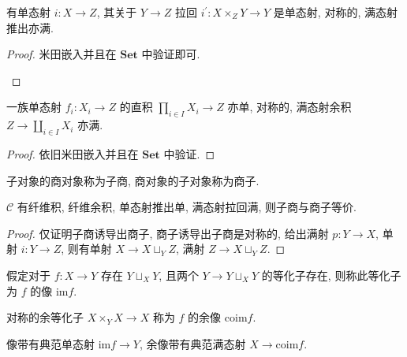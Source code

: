 \begin{lemma}
    有单态射 \(i : X \to Z\), 其关于 \(Y \to Z\) 拉回 \(i^\prime : X \times_Z Y \to Y\) 是单态射,
    对称的, 满态射推出亦满.

    \begin{proof}
        米田嵌入并且在 \(\mathbf{Set}\) 中验证即可.

        \begin{center}
        \end{center}
    \end{proof}
\end{lemma}

\begin{lemma}
    一族单态射 \(f_i : X_i \to Z\) 的直积 \(\prod_{i \in I} X_i \to Z\) 亦单, 对称的, 满态射余积 \(Z \to \coprod_{i \in I} X_i\) 亦满.

    \begin{proof}
        依旧米田嵌入并且在 \(\mathbf{Set}\) 中验证.
    \end{proof}
\end{lemma}

\begin{definition}
    子对象的商对象称为子商, 商对象的子对象称为商子.
\end{definition}

\begin{lemma}
    \(\mathcal{C}\) 有纤维积, 纤维余积, 单态射推出单, 满态射拉回满, 则子商与商子等价.

    \begin{proof}
        仅证明子商诱导出商子, 商子诱导出子商是对称的, 给出满射 \(p : Y \to X\), 单射 \(i : Y \to Z\),
        则有单射 \(X \to X \sqcup_Y Z\), 满射 \(Z \to X \sqcup_Y Z\).
    \end{proof}
\end{lemma}

\begin{definition}
    假定对于 \(f : X \to Y\) 存在 \(Y \sqcup_X Y\), 且两个 \(Y \to Y \sqcup_X Y\) 的等化子存在, 则称此等化子为 \(f\) 的像 \(\mathrm{im} f\).

    对称的余等化子 \(X \times_Y X \to X\) 称为 \(f\) 的余像 \(\mathrm{coim} f\).

    像带有典范单态射 \(\mathrm{im} f \to Y\), 余像带有典范满态射 \(X \to \mathrm{coim} f\).
\end{definition}

